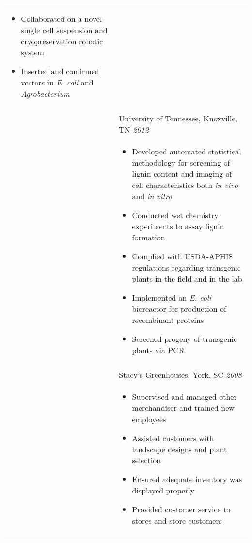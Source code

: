 \documentclass[10pt]{article}
\begin{document}
\begin{minipage}[ht]{.75\linewidth}
\begin{tabularx}{\linewidth}{p{1.8cm}M}
\begin{itemize}[topsep=-12pt,parsep=0em]
            \item Collaborated on a novel single cell suspension and cryopreservation robotic system
            \item {Inserted and confirmed vectors in \textit{E. coli} and \textit{Agrobacterium}}
         \end{itemize} \\
       &  \\
       & University of Tennessee, Knoxville, TN \textit{2012 } \\
       & \begin{itemize}[topsep=-12pt,parsep=0em]
            \setlength\itemsep{0em}
            \item Developed automated statistical methodology for screening of lignin content and imaging of cell characteristics both \textit{in vivo} and \textit{in vitro}
            \item Conducted wet chemistry experiments to assay lignin formation
            \item Complied with USDA-APHIS regulations regarding transgenic plants in the field and in the lab
            \item Implemented an \textit{E. coli} bioreactor for production of recombinant proteins
            \item Screened progeny of transgenic plants via PCR
         \end{itemize} \\
      &  \\
      & Stacy's Greenhouses, York, SC \textit{2008 } \\
      & \begin{itemize}[topsep=-12pt,parsep=0em]
           \setlength\itemsep{0em}
           \item Supervised and managed other merchandiser and trained new employees
           \item Assisted customers with landscape designs and plant selection
           \item Ensured adequate inventory was displayed properly
           \item Provided customer service to stores and store customers
         \end{itemize} \\
      &  \\

\end{tabularx}
\end{minipage}
\end{document}
